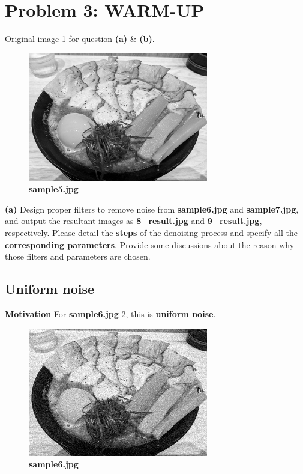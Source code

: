 \newpage
\section{Problem 3: WARM-UP}\label{problem-3-warm-up}
Original image \cref{fig3} for question \textbf{(a)} \& \textbf{(b)}.
\begin{figure}
    \centering
    \includegraphics[width=0.7\textwidth]{image/sample5.jpg}
    \caption{\textbf{sample5.jpg}}
    \label{fig3}
\end{figure}

\textbf{(a)} Design proper filters to remove noise from \textbf{sample6.jpg} and \textbf{sample7.jpg}, and output the resultant images as \textbf{8\_result.jpg} and \textbf{9\_result.jpg}, respectively. 
Please detail the {\textbf{steps} of the denoising process and specify all the \textbf{corresponding parameters}}. Provide some discussions about the reason why those filters and parameters are chosen.

\subsection{Uniform noise}
\textbf{Motivation}
For \textbf{sample6.jpg} \cref{fig3u}, this is \textbf{uniform noise}.
\begin{figure}
    \centering
    \includegraphics[width=0.7\textwidth]{image/sample6.jpg}
    \caption{\textbf{sample6.jpg}}
    \label{fig3u}
\end{figure}

